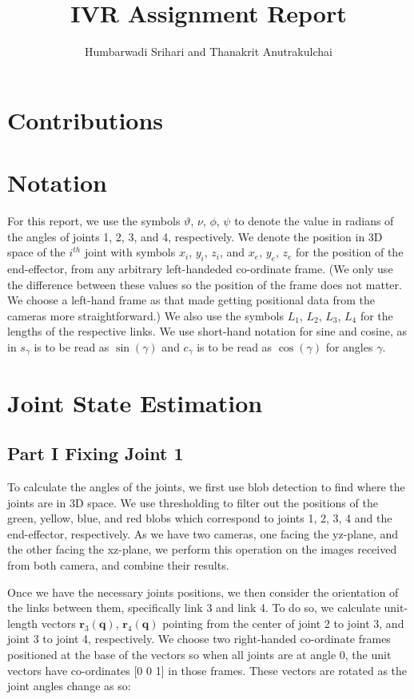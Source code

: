 \documentclass[11pt, a4paper]{article}
\title{IVR Assignment Report}
\author{Humbarwadi Srihari and Thanakrit Anutrakulchai}
\begin{document}
    \maketitle
    \section{Contributions}



    \section{Notation}
    For this report, we use the symbols
    $\vartheta$, $\nu$, $\phi$, $\psi$ to denote the value in radians of the angles 
    of joints 1, 2, 3, and 4, respectively. 
    We denote the position in 3D space of the $i^{th}$ joint with symbols
    $x_i$, $y_i$, $z_i$, and $x_e$, $y_e$, $z_e$ for the position of the end-effector,
    from any arbitrary left-handeded co-ordinate frame.
    (We only use the difference between these values so the position of the frame
    does not matter. We choose a left-hand frame as that made getting positional data
    from the cameras more straightforward.)
    We also use the symbols $L_1$, $L_2$, $L_3$, $L_4$ for the
    lengths of the respective links. 
    We use short-hand notation for sine and cosine,
    as in $s_{\gamma}$ is to be read as $\sin(\gamma)$ and $c_{\gamma}$
    is to be read as $\cos(\gamma)$ for angles $\gamma$.
    



    \section{Joint State Estimation}
    \subsection{Part I \textemdash Fixing Joint 1}
    To calculate the angles of the joints, we first use blob detection to
    find where the joints are in 3D space. %
    We use thresholding to filter out the positions of the green,
    yellow, blue, and red blobs which correspond to joints 1, 2, 3, 4 and 
    the end-effector, respectively. As we have two cameras, one facing
    the yz-plane, and the other facing the xz-plane, we perform this
    operation on the images received from both camera, and combine their
    results. %

    Once we have the necessary joints positions, we then consider the
    orientation of the links between them, specifically link 3 and link 4.
    To do so, we calculate unit-length vectors $\textbf{r}_3(\textbf{q})$,
    $\textbf{r}_4(\textbf{q})$ pointing from the center of
    joint 2 to joint 3, and joint 3 to joint 4, respectively. We choose
    two right-handed co-ordinate frames positioned at the base of the vectors
    so when all joints are at angle 0, the unit vectors have co-ordinates
    [0 0 1] in those frames.  
    These vectors are rotated as the joint angles change as so: %
\end{document}
